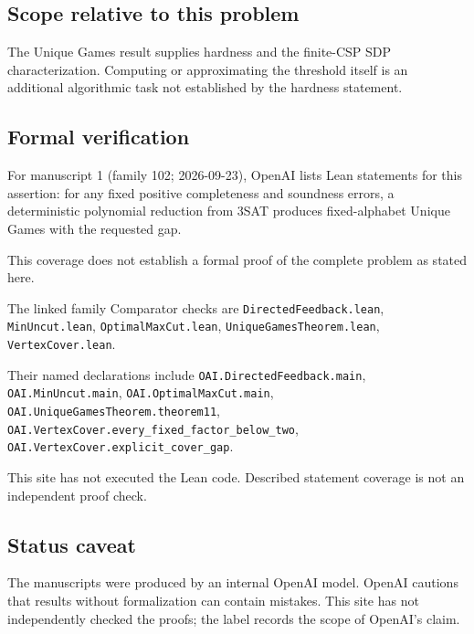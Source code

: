 \documentclass[11pt]{article}
\begin{document}
\subsection{Scope relative to this problem}
The Unique Games result supplies hardness and the finite-CSP SDP characterization. Computing or approximating the threshold itself is an additional algorithmic task not established by the hardness statement.

\subsection{Formal verification}
For manuscript 1 (family 102; 2026-09-23), OpenAI lists Lean statements for this assertion: for any fixed positive completeness and soundness errors, a deterministic polynomial reduction from 3SAT produces fixed-alphabet Unique Games with the requested gap.

This coverage does not establish a formal proof of the complete problem as stated here.

The linked family Comparator checks are \texttt{DirectedFeedback.lean}, \texttt{MinUncut.lean}, \texttt{OptimalMaxCut.lean}, \texttt{UniqueGamesTheorem.lean}, \texttt{VertexCover.lean}.

Their named declarations include \texttt{OAI.DirectedFeedback.main}, \texttt{OAI.MinUncut.main}, \texttt{OAI.OptimalMaxCut.main}, \texttt{OAI.UniqueGamesTheorem.theorem11}, \texttt{OAI.VertexCover.every\_fixed\_factor\_below\_two}, \texttt{OAI.VertexCover.explicit\_cover\_gap}.

This site has not executed the Lean code. Described statement coverage is not an independent proof check.

\subsection{Status caveat}
The manuscripts were produced by an internal OpenAI model. OpenAI cautions that results without formalization can contain mistakes. This site has not independently checked the proofs; the label records the scope of OpenAI's claim.
\end{document}
